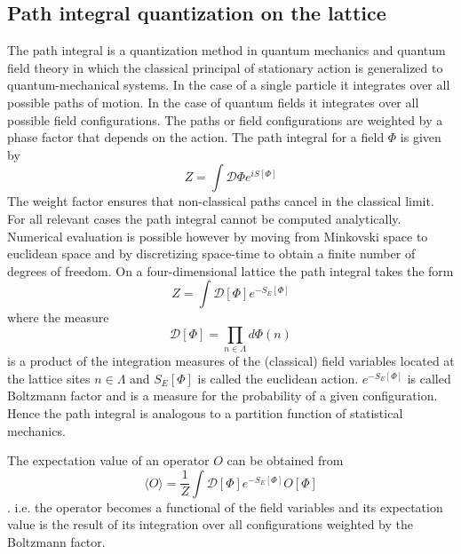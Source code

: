 \documentclass[graybox]{svmult}
\begin{document}
\subsection{Path integral quantization on the lattice}

The path integral is a quantization method in quantum mechanics and quantum field theory in which the classical principal of stationary action is generalized to quantum-mechanical systems. In the case of a single particle it integrates over all possible paths of motion. In the case of quantum fields it integrates over all possible field configurations. The paths or field configurations are weighted by a phase factor that depends on the action. The path integral for a field $\Phi$ is given by
\begin{equation}
Z = \int \mathcal{D}\Phi e^{iS[\Phi]}
\end{equation}
The weight factor ensures that non-classical paths cancel in the classical limit.
For all relevant cases the path integral cannot be computed analytically. Numerical evaluation is possible however by moving from Minkovski space to euclidean space and by discretizing space-time to obtain a finite number of degrees of freedom. On a four-dimensional lattice the path integral takes the form
\begin{equation}
Z = \int \mathcal{D}[\Phi] e^{-S_E[\Phi]}
\end{equation}
where the measure
\begin{equation}
\mathcal{D}[\Phi] = \prod_{n \in \Lambda} d\Phi(n)
\end{equation}
is a product of the integration measures of the (classical) field variables located at the lattice sites $n \in \Lambda$ and $S_E[\Phi]$ is called the euclidean action. $e^{-S_E[\Phi]}$ is called Boltzmann factor and is a measure for the probability of a given configuration. Hence the path integral is analogous to a partition function of statistical mechanics.

The expectation value of an operator $O$ can be obtained from
\begin{equation}
\langle O \rangle = \frac 1 Z \int \mathcal{D}[\Phi] e^{-S_E[\Phi]} O[\Phi]
\end{equation}.
i.e. the operator becomes a functional of the field variables and its expectation value is the result of its integration over all configurations weighted by the Boltzmann factor.

\end{document}

